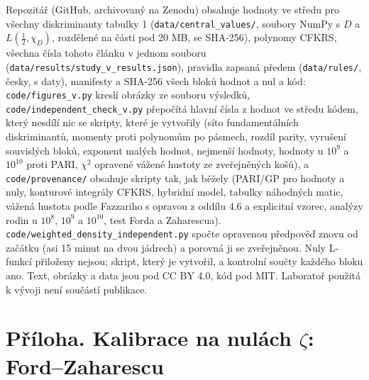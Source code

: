 \documentclass[
  10pt,
]{article}
\begin{document}
Repozitář (GitHub, archivovaný na Zenodu) obsahuje hodnoty ve středu pro
všechny diskriminanty tabulky 1 (\texttt{data/central\_values/}, soubory
NumPy s \(D\) a \(L(\tfrac12, \chi_D)\), rozdělené na části pod 20 MB,
se SHA-256), polynomy CFKRS, všechna čísla tohoto článku v jednom
souboru (\texttt{data/results/study\_v\_results.json}), pravidla zapsaná
předem (\texttt{data/rules/}, česky, s daty), manifesty a SHA-256 všech
bloků hodnot a nul a kód: \texttt{code/figures\_v.py} kreslí obrázky ze
souboru výsledků, \texttt{code/independent\_check\_v.py} přepočítá
hlavní čísla z hodnot ve středu kódem, který nesdílí nic se skripty,
které je vytvořily (síto fundamentálních diskriminantů, momenty proti
polynomům po pásmech, rozdíl parity, vyrušení souvislých bloků, exponent
malých hodnot, nejmenší hodnoty, hodnoty u \(10^9\) a \(10^{10}\) proti
PARI, \(\chi^2\) opravené vážené hustoty ze zveřejněných košů), a
\texttt{code/provenance/} obsahuje skripty tak, jak běžely (PARI/GP pro
hodnoty a nuly, konturové integrály CFKRS, hybridní model, tabulky
náhodných matic, vážená hustota podle Fazzariho s opravou z oddílu 4.6 a
explicitní vzorec, analýzy rodin u \(10^8\), \(10^9\) a \(10^{10}\),
test Forda a Zaharescua).
\texttt{code/weighted\_density\_independent.py} spočte opravenou
předpověď znovu od začátku (asi 15 minut na dvou jádrech) a porovná ji
se zveřejněnou. Nuly L-funkcí přiloženy nejsou; skript, který je
vytvořil, a kontrolní součty každého bloku ano. Text, obrázky a data
jsou pod CC BY 4.0, kód pod MIT. Laboratoř použitá k vývoji není
součástí publikace.

\hypertarget{pux159uxedloha.-kalibrace-na-nuluxe1ch-zeta-fordzaharescu}{%
\section{\texorpdfstring{Příloha. Kalibrace na nulách \(\zeta\):
Ford--Zaharescu}{Příloha. Kalibrace na nulách \textbackslash zeta: Ford--Zaharescu}}\label{pux159uxedloha.-kalibrace-na-nuluxe1ch-zeta-fordzaharescu}}
\end{document}
